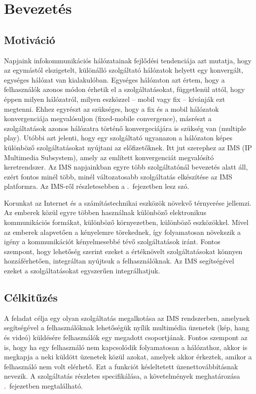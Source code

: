 
\section{Bevezetés}

\subsection{Motiváció}

Napjaink infokommunikációs hálózatainak fejlődési tendenciája azt mutatja, hogy az egymástól elszigetelt,
különálló szolgáltató hálózatok helyett egy konvergált, egységes hálózat van kialakulóban. Egységes hálózaton azt értem, hogy a felhasználók azonos módon érhetik el a szolgáltatásokat, függetlenül attól, hogy éppen milyen hálózatról, milyen eszközzel -- mobil vagy fix -- kívánják ezt megtenni. Ehhez egyrészt az szükséges, hogy a fix és a mobil hálózatok konvergenciája megvalósuljon (fixed-mobile convergence), másrészt a szolgáltatások azonos hálózatra történő konvergeciájára is szükség van (multiple play). Utóbbi azt jelenti, hogy egy szolgáltató ugyanazon a hálózaton képes különböző szolgáltatásokat nyújtani az előfizetőknek. Itt jut szerephez az IMS (IP Multimedia Subsystem), amely az említett konvergenciát megvalósító keretrendszer. Az IMS napjainkban egyre több szolgáltatónál bevezetés alatt áll, ezért fontos minél több, minél változatosabb szolgáltatás elkészítése az IMS platformra.  Az IMS-ről részletesebben a .~fejezetben lesz szó.

Korunkat az Internet és a számítástechnikai eszközök növekvő térnyerése jellemzi. Az emberek közül egyre többen használnak különböző elektronikus kommunikációs formákat, különböző környezetben, különböző eszközökkel. Mivel az emberek alapvetően a kényelemre törekednek, így folyamatosan növekszik a igény a  kommunikációt kényelmesebbé tévő szolgáltatások iránt. Fontos szempont, hogy lehetőség szerint ezeket a értéknövelt szolgáltatásokat könnyen hozzáférhetően, integráltan nyújtsuk a felhasználóknak. Az IMS segítségével ezeket a szolgáltatásokat egyszerűen integrálhatjuk.

\subsection{Célkitűzés}

A feladat célja egy olyan szolgáltatás megalkotása az IMS rendszerben, amelynek
segítségével a felhasználóknak lehetőségük nyílik multimédia üzenetek (kép, hang és videó) küldésére felhasználók egy megadott csoportjának. Fontos szempont az is, hogy ha egy felhasználó nem kapcsolódik folyamatosan a hálózathoz, akkor is megkapja a neki küldött üzenetek közül azokat, amelyek akkor érkeztek, amikor a felhasználó nem volt elérhető. Ezt a funkciót késleltetett üzenettovábbításnak nevezik. A szolgáltatás részletes specifikálása, a követelmények meghatározása .~fejezetben megtalálható.


